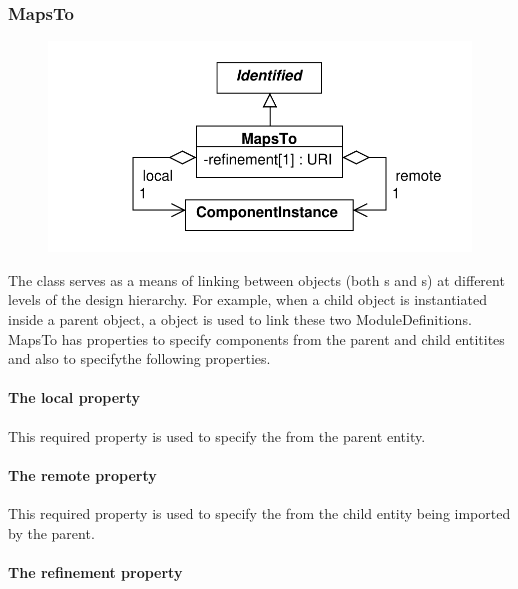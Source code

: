 \subsubsection{MapsTo}
\label{sec:MapsTo}

\begin{figure}[ht]
\begin{center}
\includegraphics[scale=0.6]{uml/maps_to}
\caption[]{}
\label{uml:maps_to}
\end{center}
\end{figure}
The  class serves as a means of linking between  objects (both s and s) at different levels of the design hierarchy. For example, when a child  object is instantiated inside a parent  object, a  object is used to link these two ModuleDefinitions. MapsTo has properties to specify components from the parent and child entitites and also to specifythe following properties.

\paragraph{The local property}
This required property is used to specify the  from the parent entity.

\paragraph{The remote property}
This required property is used to specify the  from the child entity being imported by the parent.

\paragraph{The refinement property}

